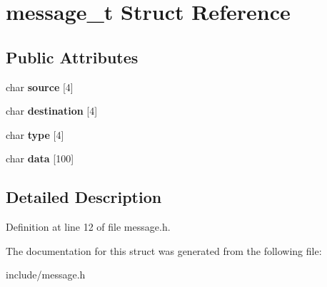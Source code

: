 \hypertarget{structdistributed__system_1_1message__t}{}\section{message\+\_\+t Struct Reference}
\label{structdistributed__system_1_1message__t}
\subsection*{Public Attributes}
\begin{DoxyCompactItemize}
\item 
char {\bfseries source} \mbox{[}4\mbox{]}\hypertarget{structdistributed__system_1_1message__t_aa3c7a4db993a2d188f67be9552a1ba9d}{}\label{structdistributed__system_1_1message__t_aa3c7a4db993a2d188f67be9552a1ba9d}

\item 
char {\bfseries destination} \mbox{[}4\mbox{]}\hypertarget{structdistributed__system_1_1message__t_ad51f70831a1d09a124fd6556c5f2f6f3}{}\label{structdistributed__system_1_1message__t_ad51f70831a1d09a124fd6556c5f2f6f3}

\item 
char {\bfseries type} \mbox{[}4\mbox{]}\hypertarget{structdistributed__system_1_1message__t_a4083c19bc4225336c3fd9e00d40ee18e}{}\label{structdistributed__system_1_1message__t_a4083c19bc4225336c3fd9e00d40ee18e}

\item 
char {\bfseries data} \mbox{[}100\mbox{]}\hypertarget{structdistributed__system_1_1message__t_a351608c09e54a0c2e6ea1f551146e348}{}\label{structdistributed__system_1_1message__t_a351608c09e54a0c2e6ea1f551146e348}

\end{DoxyCompactItemize}


\subsection{Detailed Description}


Definition at line 12 of file message.\+h.



The documentation for this struct was generated from the following file\+:\begin{DoxyCompactItemize}
\item 
include/message.\+h\end{DoxyCompactItemize}
